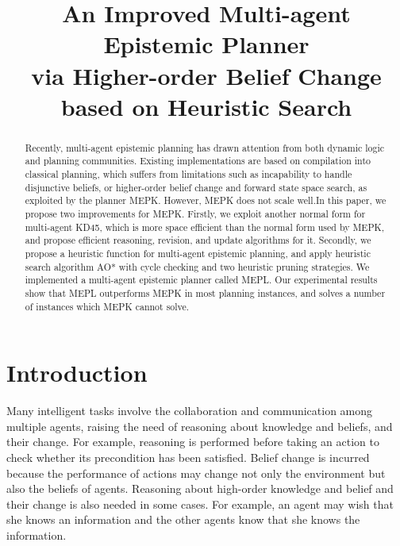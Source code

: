\documentclass{llncs}
\begin{document}
\title{An Improved Multi-agent Epistemic Planner\\ via Higher-order Belief Change \\based on Heuristic Search}

\maketitle

\begin{abstract}
  Recently, multi-agent epistemic planning has drawn attention from both dynamic logic and planning communities. Existing implementations are based on compilation into classical planning, which suffers from limitations such as incapability to handle disjunctive beliefs, or higher-order belief change and forward state space search, as exploited by the planner MEPK. However, MEPK does not scale well.In this paper, we propose two improvements for MEPK. Firstly, we exploit another normal form for multi-agent KD45, which is more space efficient than the normal form used by MEPK, and propose efficient reasoning, revision, and update algorithms for it. Secondly, we propose a heuristic function for multi-agent epistemic planning, and apply heuristic search algorithm AO* with cycle checking and two heuristic pruning strategies. We implemented a multi-agent epistemic planner called MEPL. Our experimental results show that MEPL outperforms MEPK in most planning instances, and solves a number of instances which MEPK cannot solve.



\end{abstract}

\section{Introduction}

Many intelligent tasks involve the collaboration and communication among multiple agents, raising the need of reasoning about knowledge and beliefs, and their change. For example, reasoning is performed before taking an action to check whether its precondition has been satisfied. Belief change is incurred because the performance of actions may change not only the environment but also the beliefs of agents. Reasoning about high-order knowledge and belief and their change is also needed in some cases. For example, an agent may wish that she knows an information and the other agents know that she knows the information.
\end{document}
